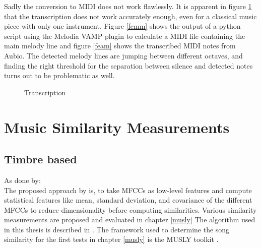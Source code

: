 \noindent Sadly the conversion to MIDI does not work flawlessly. It is apparent in figure \ref{fig:transc} that the transcription does not work accurately enough, even for a classical music piece with only one instrument. Figure \ref{femm} shows the output of a python script using the Melodia VAMP plugin to calculate a MIDI file containing the main melody line and figure \ref{feam} shows the transcribed MIDI notes from Aubio. The detected melody lines are jumping between different octaves, and finding the right threshold for the separation between silence and detected notes turns out to be problematic as well.

\begin{figure}[htbp]
	\centering
	\caption{Transcription}
	\label{fig:transc}
\end{figure}
\FloatBarrier 

\section{Music Similarity Measurements}

\subsection{Timbre based}

As done by: \cite{schnitzer1}\\
The proposed approach by \cite{schnitzer1} is, to take MFCCs as low-level features and compute statistical features like mean, standard deviation, and covariance of the different MFCCs to reduce dimensionality before computing similarities.
Various similarity measurements are proposed and evaluated in chapter \ref{musly}
The algorithm used in this thesis is described in \cite[pp. 17ff]{schnitzer1}. The framework used to determine the song similarity for the first tests in chapter \ref{musly} is the MUSLY toolkit \cite{musly1}. 

